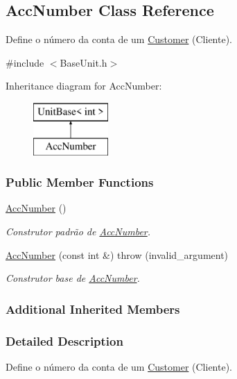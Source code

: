 \hypertarget{classAccNumber}{\subsection{Acc\-Number Class Reference}
\label{df/d00/classAccNumber}
}


Define o número da conta de um \hyperlink{classCustomer}{Customer} (Cliente).  




{\ttfamily \#include $<$Base\-Unit.\-h$>$}

Inheritance diagram for Acc\-Number\-:\begin{figure}[H]
\begin{center}
\leavevmode
\includegraphics[height=2.000000cm]{df/d00/classAccNumber}
\end{center}
\end{figure}
\subsubsection*{Public Member Functions}
\begin{DoxyCompactItemize}
\item 
\hyperlink{classAccNumber_a575010043b498581f92c6c4cd62a80ac}{Acc\-Number} ()
\begin{DoxyCompactList}\small\item\em Construtor padrão de \hyperlink{classAccNumber}{Acc\-Number}. \end{DoxyCompactList}\item 
\hyperlink{classAccNumber_adf37dc081ad18a2a6968d9d0b9f92002}{Acc\-Number} (const int \&)  throw (invalid\-\_\-argument)
\begin{DoxyCompactList}\small\item\em Construtor base de \hyperlink{classAccNumber}{Acc\-Number}. \end{DoxyCompactList}\end{DoxyCompactItemize}
\subsubsection*{Additional Inherited Members}


\subsubsection{Detailed Description}
Define o número da conta de um \hyperlink{classCustomer}{Customer} (Cliente). 

